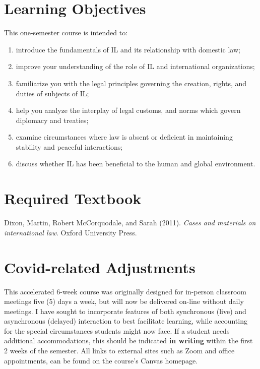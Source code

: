 \documentclass[10pt,]{article}
\providecommand{\tightlist}{%
  \setlength{\itemsep}{0pt}\setlength{\parskip}{0pt}}
\begin{document}
\hypertarget{learning-objectives}{%
\section{Learning Objectives}\label{learning-objectives}}

This one-semester course is intended to:

\begin{enumerate}
\def\labelenumi{\arabic{enumi}.}
\tightlist
\item
  introduce the fundamentals of IL and its relationship with domestic
  law;
\item
  improve your understanding of the role of IL and international
  organizations;
\item
  familiarize you with the legal principles governing the creation,
  rights, and duties of subjects of IL;
\item
  help you analyze the interplay of legal customs, and norms which
  govern diplomacy and treaties;
\item
  examine circumstances where law is absent or deficient in maintaining
  stability and peaceful interactions;
\item
  discuss whether IL has been beneficial to the human and global
  environment.
\end{enumerate}

\hypertarget{required-textbook}{%
\section{Required Textbook}\label{required-textbook}}

Dixon, Martin, Robert McCorquodale, and Sarah (2011).
\emph{Cases and materials on international law}. Oxford University
Press.

\hypertarget{covid-related-adjustments}{%
\section{Covid-related Adjustments}\label{covid-related-adjustments}}

This accelerated 6-week course was originally designed for in-person
classroom meetings five (5) days a week, but will now be delivered
on-line without daily meetings. I have sought to incorporate features of
both synchronous (live) and asynchronous (delayed) interaction to best
facilitate learning, while accounting for the special circumstances
students might now face. If a student needs additional accommodations,
this should be indicated \textbf{in writing} within the first 2 weeks of
the semester. All links to external sites such as Zoom and office
appointments, can be found on the course's Canvas homepage.
\end{document}
